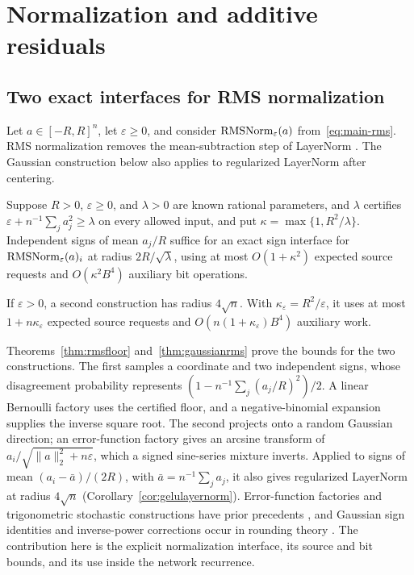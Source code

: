 \section{Normalization and additive residuals}
\label{sec:additive-main}

\subsection{Two exact interfaces for RMS normalization}

Let $a\in[-R,R]^n$, let $\varepsilon\ge0$, and consider
$\operatorname{RMSNorm}_\varepsilon(a)$ from~\eqref{eq:main-rms}.
RMS normalization removes the mean-subtraction step of
LayerNorm \cite{zhang2019rmsnorm}. The Gaussian construction
below also applies to regularized LayerNorm after centering.

\begin{theorem}
\label{thm:main-rms}
Suppose $R>0$, $\varepsilon\ge0$, and $\lambda>0$ are known rational
parameters, and $\lambda$ certifies
$\varepsilon+n^{-1}\sum_j a_j^2\ge\lambda$ on every allowed input,
and put $\kappa=\max\{1,R^2/\lambda\}$. Independent signs of mean
$a_j/R$ suffice for an exact sign interface for
$\operatorname{RMSNorm}_\varepsilon(a)_i$ at radius $2R/\sqrt\lambda$, using at most
$O(1+\kappa^2)$ expected source requests and
$O(\kappa^2B^4)$ auxiliary bit operations.

If $\varepsilon>0$, a second construction has radius $4\sqrt n$.
With $\kappa_\varepsilon=R^2/\varepsilon$, it uses at most
$1+n\kappa_\varepsilon$ expected source requests and
$O(n(1+\kappa_\varepsilon)B^4)$ auxiliary work.
\end{theorem}

Theorems~\ref{thm:rmsfloor} and~\ref{thm:gaussianrms} prove the bounds
for the two constructions. The first samples a coordinate and two independent
signs, whose disagreement probability represents
$(1-n^{-1}\sum_j(a_j/R)^2)/2$. A linear Bernoulli factory uses
the certified floor, and a negative-binomial expansion supplies
the inverse square root. The second projects onto a random Gaussian
direction; an error-function factory gives an arcsine transform of
$a_i/\sqrt{\|a\|_2^2+n\varepsilon}$, which a signed sine-series
mixture inverts. Applied to signs of mean $(a_i-\bar a)/(2R)$, with
$\bar a=n^{-1}\sum_j a_j$, it also gives regularized LayerNorm at
radius $4\sqrt n$ (Corollary~\ref{cor:gelulayernorm}).
Error-function factories and trigonometric stochastic constructions
have prior precedents \cite{flajolet2011buffon,gaines1969}, and
Gaussian sign identities and inverse-power corrections occur
in rounding theory \cite{braverman2011grothendieck}.
The contribution here is the explicit normalization interface,
its source and bit bounds, and its use inside the network
recurrence.


